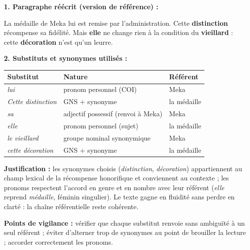 \documentclass[11pt]{article}
\begin{document}
\begin{corrige}
\textbf{1. Paragraphe réécrit (version de référence) :}

\og La médaille de Meka lui est remise par l'administration. Cette \textbf{distinction} récompense sa fidélité. Mais \textbf{elle} ne change rien à la condition du \textbf{vieillard} : cette \textbf{décoration} n'est qu'un leurre. \fg{}

\textbf{2. Substituts et synonymes utilisés :}
\begin{center}
\begin{tabularx}{\linewidth}{|l|X|l|}\hline
\rowcolor{popblueL}\textbf{Substitut} & \textbf{Nature} & \textbf{Référent} \\ \hline
\emph{lui} & pronom personnel (COI) & Meka \\ \hline
\emph{Cette distinction} & GNS + synonyme & la médaille \\ \hline
\emph{sa} & adjectif possessif (renvoi à Meka) & Meka \\ \hline
\emph{elle} & pronom personnel (sujet) & la médaille \\ \hline
\emph{le vieillard} & groupe nominal synonymique & Meka \\ \hline
\emph{cette décoration} & GNS + synonyme & la médaille \\ \hline
\end{tabularx}
\end{center}
\textbf{Justification :} les synonymes choisis (\emph{distinction}, \emph{décoration}) appartiennent au champ lexical de la récompense honorifique et conviennent au contexte ; les pronoms respectent l'accord en genre et en nombre avec leur référent (\emph{elle} reprend \emph{médaille}, féminin singulier). Le texte gagne en fluidité sans perdre en clarté : la chaîne référentielle reste cohérente.

\textbf{Points de vigilance :} vérifier que chaque substitut renvoie sans ambiguïté à un seul référent ; éviter d'alterner trop de synonymes au point de brouiller la lecture ; accorder correctement les pronoms.
\end{corrige}
\end{document}
